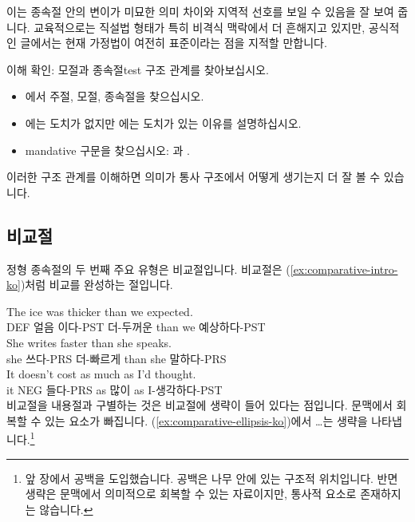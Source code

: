 이는 종속절 안의 변이가 미묘한 의미 차이와 지역적 선호를 보일 수 있음을 잘 보여 줍니다. 교육적으로는 직설법 형태가 특히 비격식 맥락에서 더 흔해지고 있지만, 공식적인 글에서는 현재 가정법이 여전히 표준이라는 점을 지적할 만합니다.

\begin{tblsframedsymbol}{이해 확인: 모절과 종속절}{test}
구조 관계를 찾아보십시오.
\begin{itemize}[noitemsep, leftmargin=*]
    \item {}에서 주절, 모절, 종속절을 찾으십시오.
    \item {}에는 도치가 없지만 에는 도치가 있는 이유를 설명하십시오.
    \item mandative 구문을 찾으십시오: 과 .
\end{itemize}
이러한 구조 관계를 이해하면 의미가 통사 구조에서 어떻게 생기는지 더 잘 볼 수 있습니다.
\end{tblsframedsymbol}

\subsection{비교절}

정형 종속절의 두 번째 주요 유형은 비교절입니다. 비교절은 (\ref{ex:comparative-intro-ko})처럼 비교를 완성하는 절입니다.

\ea \label{ex:comparative-intro-ko}
    \ea \gll The ice was thicker than {\ob}we expected{\cb}.\\
        DEF 얼음 이다-PST 더-두꺼운 than we 예상하다-PST\\
    \glt {}
    \ex \gll She writes faster than {\ob}she speaks{\cb}.\\
        she 쓰다-PRS 더-빠르게 than she 말하다-PRS\\
    \glt {}
    \ex \gll It doesn't cost as much as {\ob}I'd thought{\cb}.\\
        it NEG 들다-PRS as 많이 as I-생각하다-PST\\
    \glt {}
    \z
\z
비교절을 내용절과 구별하는 것은 비교절에 생략이 들어 있다는 점입니다. 문맥에서 회복할 수 있는 요소가 빠집니다. (\ref{ex:comparative-ellipsis-ko})에서 \dots 는 생략을 나타냅니다.\footnote{앞 장에서 공백을 도입했습니다. 공백은 나무 안에 있는 구조적 위치입니다. 반면 생략은 문맥에서 의미적으로 회복할 수 있는 자료이지만, 통사적 요소로 존재하지는 않습니다.}

